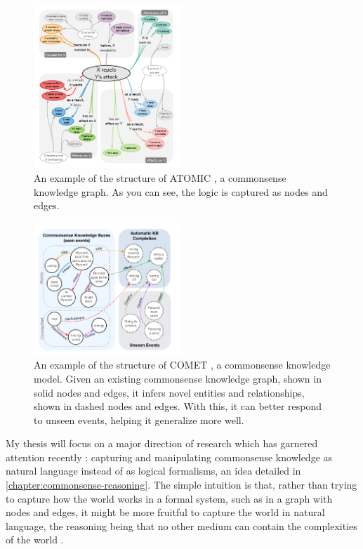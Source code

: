 \documentclass[12pt]{report}
\begin{document}
\begin{figure}
    \includegraphics[width=0.5\textwidth]{diagrams/atomic-example.png}
    \caption{An example of the structure of ATOMIC \cite{Sap2019-ob}, a commonsense knowledge graph. As you can see, the logic is captured as nodes and edges.}
    \label{figure:atomic}
\end{figure}

\begin{figure}
    \includegraphics[width=0.5\textwidth]{diagrams/comet-example.png}
    \caption{An example of the structure of COMET \cite{Bosselut2019-he}, a commonsense knowledge model. Given an existing commonsense knowledge graph, shown in solid nodes and edges, it infers novel entities and relationships, shown in dashed nodes and edges. With this, it can better respond to unseen events, helping it generalize more well.}
    \label{figure:comet}
\end{figure}

My thesis will focus on a major direction of research which has garnered attention recently \cite{Choi2022-to}: capturing and manipulating commonsense knowledge as natural language instead of as logical formalisms, an idea detailed in \cref{chapter:commonsense-reasoning}.
The simple intuition is that, rather than trying to capture how the world works in a formal system, such as in a graph with nodes and edges, it might be more fruitful to capture the world in natural language, the reasoning being that no other medium can contain the complexities of the world \cite{Choi2022-to}.
\end{document}
